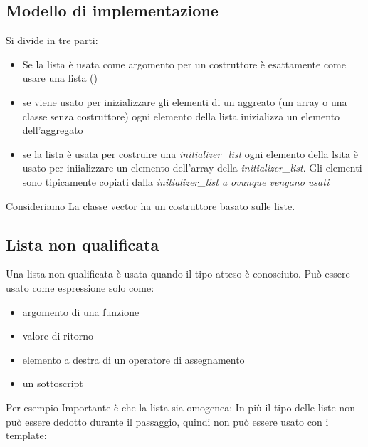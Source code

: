 \documentclass[11pt,a4paper]{book}
\begin{document}
\subsection{Modello di implementazione}
Si divide in tre parti:
\begin{itemize}
	\item Se la lista è usata come argomento per un costruttore è esattamente come usare una lista ()
	\item se viene usato per inizializzare gli elementi di un aggreato (un array o una classe senza costruttore) ogni elemento della lista inizializza un elemento dell'aggregato
	\item se la lista è usata per costruire una \emph{initializer\_list} ogni elemento della lsita è usato per iniializzare un elemento dell'array della \emph{initializer\_list}. Gli elementi sono tipicamente copiati dalla \emph{initializer\_list a ovunque vengano usati}
\end{itemize}

Consideriamo
\label{code: 169}
La classe vector ha un costruttore basato sulle liste.

\subsection{Lista non qualificata}
Una lista non qualificata è usata quando il tipo atteso è conosciuto. Può essere usato come espressione solo come:
\begin{itemize}
	\item argomento di una funzione
	\item valore di ritorno
	\item elemento a destra di un operatore di assegnamento
	\item un sottoscript
\end{itemize}
Per esempio
\label{code: 170}
Importante è che la lista sia omogenea:
\label{code: 171}
In più il tipo delle liste non può essere dedotto durante il passaggio, quindi non può essere usato con i template:
\label{code: 172}
\end{document}
